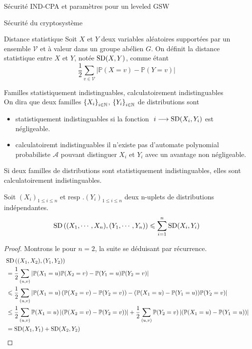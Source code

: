 \begin{section}{Sécurité IND-CPA et paramètres pour un leveled GSW}
	\begin{subsection}{Sécurité du cryptosystème}

	\begin{definition}{Distance statistique}
	Soit $X$ et $Y$ deux variables aléatoires supportées par
	un ensemble $\mathcal{V}$ et à valeur 
	dans un groupe abélien $G$. On définit la distance 
	statistique entre $X$ et $Y$, notée $\text{SD}(X,Y)$, 
	comme étant
	\[ \frac{1}{2} \sum_{v \in \mathcal{V}} |\mathbb{P}(X = v) -
	\mathbb{P}(Y = v)| \]

	\end{definition}

	\begin{definition}{Familles statistiquement indistinguables, calculatoirement indistinguables} \\
	On dira que deux familles ${\{X_i\}}_{i \in \mathbb{N}}$, ${\{Y_i\}}_{i \in \mathbb{N}}$
	de distributions sont 
	\begin{itemize}
	\item statistiquement indistinguables si la fonction $ i \longrightarrow \SD(X_i, Y_i) $ est négligeable.
	\item calculatoiremt indistinguables il n'existe pas d'automate polynomial probabiliste $\mathcal{A}$
	pouvant distinguer $X_i$ et $Y_i$ avec un avantage non négligeable.
	\end{itemize}
	\begin{prop}
	Si deux familles de distributions sont statistiquement
	indistinguables, elles sont calculatoirement indistinguables.
	\end{prop} 

	\end{definition}
	\begin{prop} \label{sd_add}
	Soit ${(X_i)}_{1\leqslant i \leqslant n}$ et resp .${(Y_i)}_{1\leqslant i\leqslant n}$
	deux n-uplets de distributions indépendantes.
	\[ \text{SD}\left((X_1,\cdots,X_n), (Y_1, \cdots, Y_n)\right) \leqslant \sum_{i=1}^n \text{SD}(X_i,Y_i) \]
	\end{prop}
	\begin{proof}
	Montrons le pour $n = 2$, la suite se déduisant par récurrence.
	\begin{align*}
		&\SD\left((X_1,X_2),(Y_1,Y_2)\right) \\
		&= \frac{1}{2} \sum_{(u,v)}\left| \PP(X_1=u)\PP(X_2=v) -
		\PP(Y_1=u)\PP(Y_2=v) \right| \\ 
		&\leqslant
		\frac{1}{2} \sum_{(u,v)}\left| \PP(X_1=u)\left(\PP(X_2=v) - \PP(Y_2 = v)\right)
		- (\PP(X_1 = u) - \PP(Y_1=u))\PP(Y_2=v) \right| \\
		&\leq
		\frac{1}{2} \sum_{(u,v)} \PP(X_1 = u)
		\left|\left(\PP(X_2=v) - \PP(Y_2 = v)\right) \right| + 
		\frac{1}{2} \sum_{(u,v)}\PP(Y_2=v)\left|(\PP(X_1 = u) - \PP(Y_1=u)) \right| \\
		&= \SD(X_1, Y_1) + \SD(X_2, Y_2)
	\end{align*}
	\end{proof}


\end{subsection}
\end{section}
